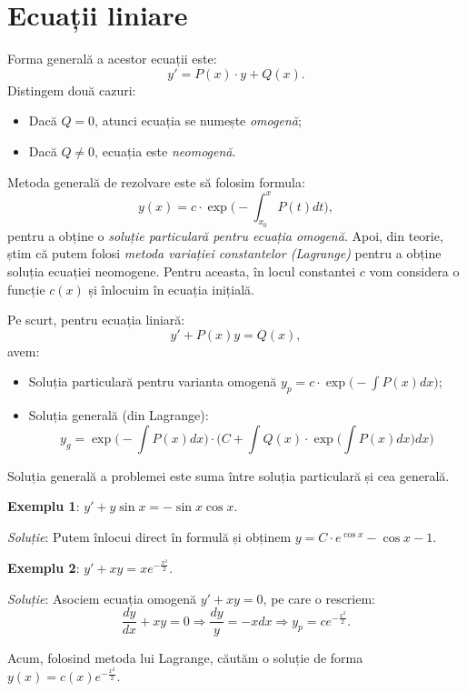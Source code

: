 \documentclass[11pt,a4paper]{article}
\theoremstyle{dotless}
\theoremstyle{dotlessdr}
\begin{document}

\section{Ecuații liniare}
\label{sec:lin}

Forma generală a acestor ecuații este:
\[
  y' = P(x) \cdot y + Q(x).
\]
Distingem două cazuri:
\begin{itemize}
\item Dacă $Q = 0$, atunci ecuația se numește \emph{omogenă};
\item Dacă $Q \neq 0$, ecuația este \emph{neomogenă}.
\end{itemize}

Metoda generală de rezolvare este să folosim formula:
\[
  y(x) = c \cdot \exp \Big( -\int_{x_0}^x P(t) dt \Big),
\]
pentru a obține o \emph{soluție particulară pentru ecuația omogenă}. Apoi, din teorie,
știm că putem folosi \emph{metoda variației constantelor (Lagrange)} pentru a obține
soluția ecuației neomogene. Pentru aceasta, în locul constantei $c$ vom considera
o funcție $c(x)$ și înlocuim în ecuația inițială.

Pe scurt, pentru ecuația liniară:
\[
  y' + P(x) y = Q(x),
\]
avem:
\begin{itemize}
  \item Soluția particulară pentru varianta omogenă $y_p = c \cdot \exp\Big( -\int P(x) dx \Big)$;
  \item Soluția generală (din Lagrange):
    \[
      y_g = \exp\Big(-\int P(x) dx\Big) \cdot \Big( C + \int Q(x) \cdot \exp\Big( \int P(x) dx \Big) dx \Big)
    \]
\end{itemize}

Soluția generală a problemei este suma între soluția particulară și cea generală.


\textbf{Exemplu 1}: $y' + y \sin x = -\sin x \cos x$.

\emph{Soluție}: Putem înlocui direct în formulă și obținem $y = C \cdot e^{\cos x} - \cos x - 1$.

\vspace{1cm}

\textbf{Exemplu 2}: $y' + xy = x e^{-\frac{x^2}{2}}$.

\emph{Soluție}: Asociem ecuația omogenă $y' + xy = 0$, pe care o rescriem:
\[
  \frac{dy}{dx} + xy = 0 \Rightarrow \frac{dy}{y} = -xdx \Rightarrow y_p = ce^{-\frac{x^2}{2}}.
\]

Acum, folosind metoda lui Lagrange, căutăm o soluție de forma $y(x) = c(x) e^{-\frac{x^2}{2}}$.
\end{document}
